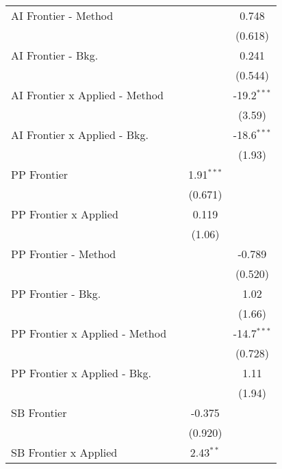 \begin{tabular}{lccc}
   AI Frontier - Method           &           &               & 0.748\\   
                                  &           &               & (0.618)\\   
   AI Frontier - Bkg.             &           &               & 0.241\\   
                                  &           &               & (0.544)\\   
   AI Frontier x Applied - Method &           &               & -19.2$^{***}$\\   
                                  &           &               & (3.59)\\   
   AI Frontier x Applied - Bkg.   &           &               & -18.6$^{***}$\\   
                                  &           &               & (1.93)\\   
   PP Frontier                    &           & 1.91$^{***}$  &   \\   
                                  &           & (0.671)       &   \\   
   PP Frontier x Applied          &           & 0.119         &   \\   
                                  &           & (1.06)        &   \\   
   PP Frontier - Method           &           &               & -0.789\\   
                                  &           &               & (0.520)\\   
   PP Frontier - Bkg.             &           &               & 1.02\\   
                                  &           &               & (1.66)\\   
   PP Frontier x Applied - Method &           &               & -14.7$^{***}$\\   
                                  &           &               & (0.728)\\   
   PP Frontier x Applied - Bkg.   &           &               & 1.11\\   
                                  &           &               & (1.94)\\   
   SB Frontier                    &           & -0.375        &   \\   
                                  &           & (0.920)       &   \\   
   SB Frontier x Applied          &           & 2.43$^{**}$   &   \\   

\end{tabular}
